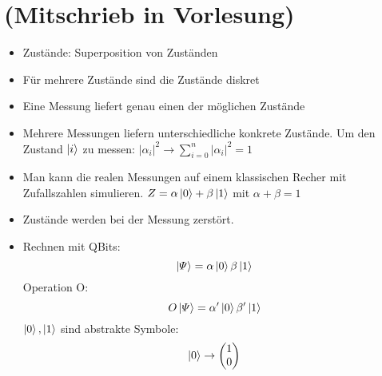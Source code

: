 \chapter{(Mitschrieb in Vorlesung)}
\begin{itemize}
\item Zustände: Superposition von Zuständen
\item Für mehrere Zustände sind die Zustände diskret
\item Eine Messung liefert genau einen der möglichen Zustände
\item Mehrere Messungen liefern unterschiedliche konkrete Zustände. Um den Zustand $\ket{i}$ zu messen: $\left\lvert \alpha_i \right\rvert ^2 \rightarrow \sum_{i = 0}^{n} \left\lvert \alpha_i \right\rvert ^2 = 1$
\item Man kann die realen Messungen auf einem klassischen Recher mit Zufallszahlen simulieren.
$Z=\alpha\ket{0}+\beta\ket{1}$ mit $\alpha + \beta = 1$
\item Zustände werden bei der Messung zerstört.
\item Rechnen mit QBits: \\
$$
\ket{\varPsi} = \alpha\ket{0}\beta\ket{1}
$$
Operation O:
$$
O \ket{\varPsi} = \alpha'\ket{0}\beta'\ket{1}
$$
$\ket{0},\ket{1}$ sind abstrakte Symbole:
$$
\ket{0}\rightarrow \begin{pmatrix}
    1 \\ 0
\end{pmatrix}
$$
\end{itemize}

